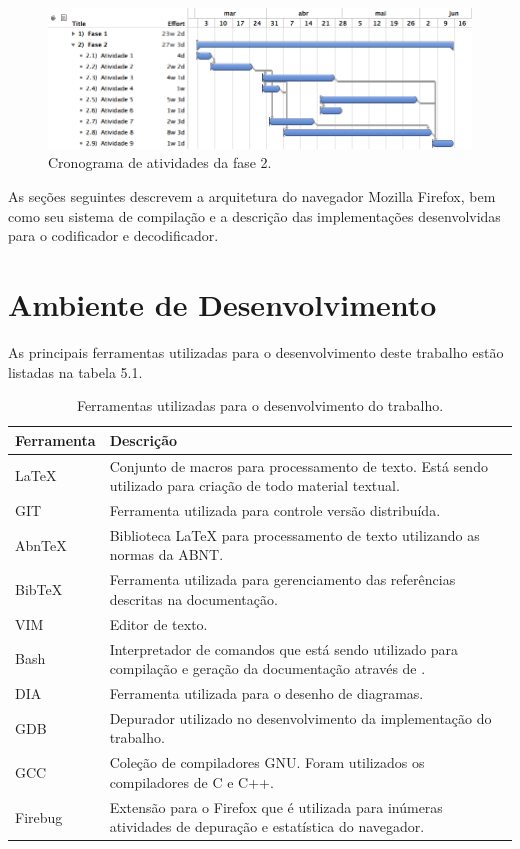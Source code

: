 \documentclass[espaco=simples,appendix=Name]{abnt}
\begin{document}
\begin{figure}[h]
  \centering
    \includegraphics[scale=0.5]{fase2.png}
  \caption{Cronograma de atividades da fase 2.}
\end{figure}

As seções seguintes descrevem a arquitetura do navegador Mozilla Firefox, bem como seu sistema de compilação e a descrição das implementações desenvolvidas para o codificador e decodificador.

\section{Ambiente de Desenvolvimento}

As principais ferramentas utilizadas para o desenvolvimento deste trabalho estão listadas na tabela 5.1.

\begin{table}[ht]
	\centering
	\caption{Ferramentas utilizadas para o desenvolvimento do trabalho.
	\label{tbl:padc}}{
		\vspace{0.3cm}
		\begin{tabular}{|l|p{14cm}|}
	    	\hline
			\textbf{Ferramenta} & \textbf{Descrição} \\
			\hline
			LaTeX		& Conjunto de macros para processamento de texto. Está sendo utilizado para criação de todo material textual. \\
			\hline
			GIT		& Ferramenta utilizada para controle versão distribuída. \\
			\hline
			AbnTeX		& Biblioteca LaTeX para processamento de texto utilizando as normas da ABNT. \\
			\hline
			BibTeX		& Ferramenta utilizada para gerenciamento das referências descritas na documentação. \\
			\hline
			VIM		& Editor de texto. \\
			\hline
			Bash		& Interpretador de comandos que está sendo utilizado para compilação e geração da documentação através de \ingles{scripts}. \\
			\hline
			DIA		& Ferramenta utilizada para o desenho de diagramas. \\
			\hline
			GDB		& Depurador utilizado no desenvolvimento da implementação do trabalho. \\
			\hline
			GCC		& Coleção de compiladores GNU. Foram utilizados os compiladores de C e C++. \\
			\hline
			Firebug		& Extensão para o Firefox que é utilizada para inúmeras atividades de depuração e estatística do navegador. \\
			\hline
		\end{tabular}
		}
\end{table}
\end{document}
